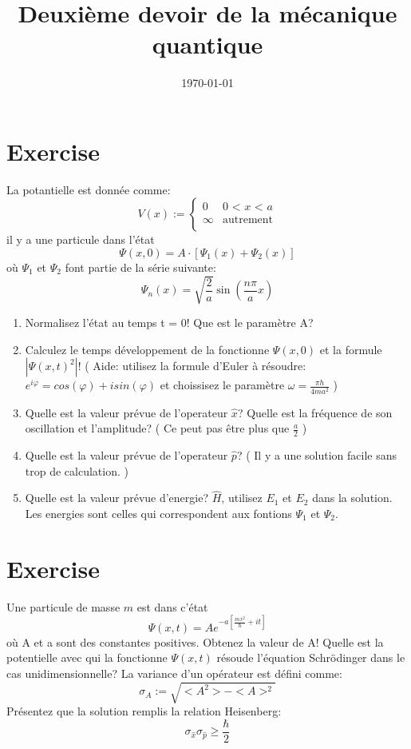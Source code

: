 \documentclass[12pt, a4paper]{article}
\author{}
\title{Deuxième devoir de la mécanique quantique}
\date{\today}
\begin{document}
\maketitle
\section{Exercise}
\par La potantielle est donnée comme:
\begin{equation*}
V(x) := \begin{cases}
	0 & \text{0 < $x$ < $a$} \\
	\infty & \text{autrement} \\
\end{cases}
\end{equation*}
il y a une particule dans l'état
\begin{equation*}
\Psi(x,0) = A\cdot[\Psi_{1}(x) + \Psi_{2}(x)]
\end{equation*}
où $\Psi_{1}$ et $\Psi_{2}$ font partie de la série suivante:
\begin{equation*}
\Psi_{n}(x) = \sqrt{\frac{2}{a}}\sin({\frac{n\pi}{a}x})
\end{equation*}
\begin{enumerate}[label=\alph*)]
\item Normalisez l'état au temps t = 0! Que est le paramètre A?
\item Calculez le temps développement de la fonctionne $\Psi(x,0)$ et la formule $|\Psi(x,t)^{2}|$! ( Aide: utilisez la formule d'Euler à
résoudre: $e^{i\varphi} = cos(\varphi) + isin(\varphi)$ et choissisez le paramètre $\omega = \frac{\pi h}{4ma^{2}}$ )
\item Quelle est la valeur prévue de l'operateur $\hat{x}$? Quelle est la fréquence de son oscillation et l'amplitude? ( Ce peut pas être plus que
$\frac{a}{2}$ )
\item Quelle est la valeur prévue de l'operateur $\hat{p}$? ( Il y a une solution facile sans trop de calculation. )
\item Quelle est la valeur prévue d'energie? $\hat{H}$, utilisez $E_{1}$ et $E_{2}$ dans la solution. Les energies sont celles qui correspondent
aux fontions $\Psi_{1}$ et $\Psi_{2}$.
\end{enumerate}
\section{Exercise}
\par Une particule de masse $m$ est dans c'état
\begin{equation*}
\Psi(x,t) = Ae^{-a[\frac{mx^{2}}{\hbar} + it]}
\end{equation*}
où A et a sont des constantes positives. Obtenez la valeur de A! Quelle est la potentielle avec qui la fonctionne $\Psi(x,t)$ résoude l'équation
Schrödinger dans le cas unidimensionnelle? La variance d'un opérateur est défini comme:
\begin{equation*}
\sigma_{A} := \sqrt{<A^{2}> - <A>^{2}}
\end{equation*}
Présentez que la solution remplis la relation Heisenberg:
\begin{equation*}
\sigma_{\hat{x}}\sigma_{\hat{p}} \geq \frac{\hbar}{2}
\end{equation*}
\end{document}
